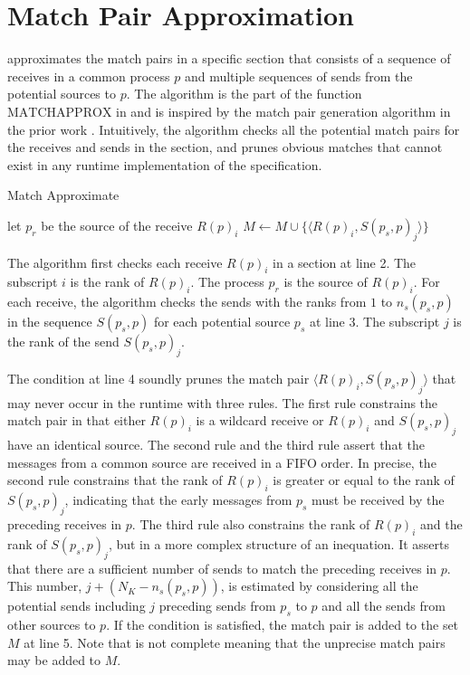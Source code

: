 \section{Match Pair Approximation}

 approximates the match pairs in a specific section that consists of a sequence of receives in a common process $p$ and multiple sequences of sends from the potential sources to $p$.
The algorithm is the part of the function $\mathrm{MATCHAPPROX}$ in  and is inspired by the match pair generation algorithm in the prior work \cite{}. 
Intuitively, the algorithm checks all the potential match pairs for the receives and sends in the section, and prunes obvious matches that cannot exist in any runtime implementation of the specification.

\begin{algorithm}
\caption{Match Approximate}\label{algo:match}
\begin{algorithmic}[1]
\State let $p_r$ be the source of the receive $R(p)_i$
\State $M\gets M\cup\{\langle R(p)_i,S(p_s,p)_j \rangle\}$
\EndIf
\EndFor
\EndFor
\end{algorithmic}
\end{algorithm}

The algorithm first checks each receive $R(p)_i$ in a section at line 2. The subscript $i$ is the rank of $R(p)_i$. The process $p_r$ is the source of $R(p)_i$.
For each receive, the algorithm checks the sends with the ranks from $1$ to $n_s(p_s,p)$ in the sequence $S(p_s,p)$ for each potential source $p_s$ at line 3.
The subscript $j$ is the rank of the send $S(p_s,p)_j$. 

The condition at line 4 soundly prunes the match pair $\langle R(p)_i,S(p_s,p)_j\rangle$ that may never occur in the runtime with three rules. The first rule constrains the match pair in that either $R(p)_i$ is a wildcard receive or $R(p)_i$ and $S(p_s,p)_j$ have an identical source. The second rule and the third rule assert that the messages from a common source are received in a FIFO order. In precise, the second rule constrains that the rank of $R(p)_i$ is greater or equal to the rank of $S(p_s,p)_j$, indicating that the early messages from $p_s$ must be received by the preceding receives in $p$. The third rule also constrains the rank of $R(p)_i$ and the rank of $S(p_s,p)_j$, but in a more complex structure of an inequation. It asserts that there are a sufficient number of sends to match the preceding receives in $p$. This number, $j + (N_K - \mathit{n_s}(p_s,p))$, is estimated by considering all the potential sends including $j$ preceding sends from $p_s$ to $p$ and all the sends from other sources to $p$.
If the condition is satisfied, the match pair is added to the set $M$ at line 5. Note that  is not complete meaning that the unprecise match pairs may be added to $M$.

